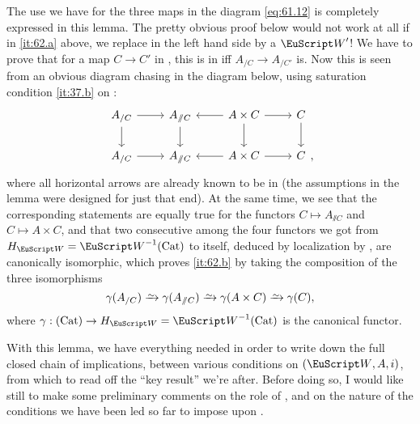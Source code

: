 The use we have for the three maps in the diagram \eqref{eq:61.12} is
completely expressed in this lemma. The pretty obvious proof below
would not work at all if in \ref{it:62.a} above, we replace \scrW{} in
the left hand side by a $\scrW'$! We have to prove that for a map
$C\to C'$ in \Cat, this is in \scrW{} if{f} $A_{/C}\to A_{/C'}$
is. Now this is seen from an obvious diagram chasing in the diagram
below, using saturation condition \ref{it:37.b} on \scrW:
\[\begin{tikzcd}[baseline=(O.base)]
  A_{/C} \ar[d]\ar[r] & A_{\sslash C} \ar[d] &
  A\times C \ar[r]\ar[d]\ar[l] & C \ar[d] \\
  A_{/C} \ar[r] & A_{\sslash C}  &
  A\times C \ar[r]\ar[l] & |[alias=O]| C
\end{tikzcd},\]
where all horizontal arrows are already known to be in \scrW{} (the
assumptions in the lemma were designed for just that end). At the same
time, we see that the corresponding statements are equally true for
the functors $C\mapsto A_{\sslash C}$ and $C\mapsto A\times C$, and
that two consecutive among the four functors we got from
$H_\scrW=\scrW^{-1}\Cat$ to itself, deduced by localization by \scrW,
are canonically isomorphic, which proves \ref{it:62.b} by taking the
composition of the three isomorphisms
\[\gamma(A_{/C}) \tosim \gamma(A_{\sslash C}) \tosim \gamma(A\times C)
\tosim \gamma(C),\]
where $\gamma:\Cat\to H_\scrW=\scrW^{-1}\Cat$ is the canonical
functor.

With this lemma, we have everything needed in order to write down the
full closed chain of implications, between various conditions on
$(\scrW, A, i)$, from which to read off the ``key result'' we're
after. Before doing so, I would like still to make some preliminary
comments on the role of \scrW, and on the nature of the conditions we
have been led so far to impose upon \scrW.

